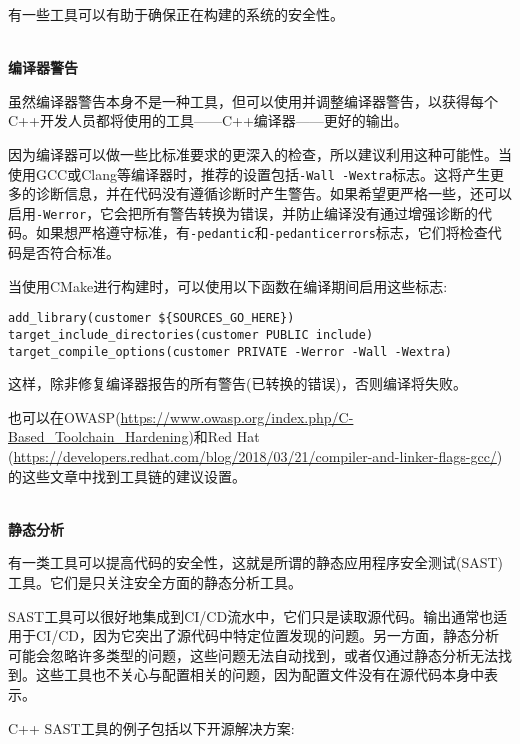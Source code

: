 有一些工具可以有助于确保正在构建的系统的安全性。

\hspace*{\fill} \\ %
\noindent
\textbf{编译器警告}

虽然编译器警告本身不是一种工具，但可以使用并调整编译器警告，以获得每个C++开发人员都将使用的工具——C++编译器——更好的输出。

因为编译器可以做一些比标准要求的更深入的检查，所以建议利用这种可能性。当使用GCC或Clang等编译器时，推荐的设置包括\texttt{-Wall -Wextra}标志。这将产生更多的诊断信息，并在代码没有遵循诊断时产生警告。如果希望更严格一些，还可以启用\texttt{-Werror}，它会把所有警告转换为错误，并防止编译没有通过增强诊断的代码。如果想严格遵守标准，有\texttt{-pedantic}和\texttt{-pedanticerrors}标志，它们将检查代码是否符合标准。

当使用CMake进行构建时，可以使用以下函数在编译期间启用这些标志:

\begin{lstlisting}[style=styleCMake]
add_library(customer ${SOURCES_GO_HERE})
target_include_directories(customer PUBLIC include)
target_compile_options(customer PRIVATE -Werror -Wall -Wextra)
\end{lstlisting}

这样，除非修复编译器报告的所有警告(已转换的错误)，否则编译将失败。

也可以在OWASP(\url{https://www.owasp.org/index.php/C-Based\_Toolchain\_Hardening})和Red Hat (\url{https://developers.redhat.com/blog/2018/03/21/compiler-and-linker-flags-gcc/})的这些文章中找到工具链的建议设置。

\hspace*{\fill} \\ %
\noindent
\textbf{静态分析}

有一类工具可以提高代码的安全性，这就是所谓的静态应用程序安全测试(SAST)工具。它们是只关注安全方面的静态分析工具。

SAST工具可以很好地集成到CI/CD流水中，它们只是读取源代码。输出通常也适用于CI/CD，因为它突出了源代码中特定位置发现的问题。另一方面，静态分析可能会忽略许多类型的问题，这些问题无法自动找到，或者仅通过静态分析无法找到。这些工具也不关心与配置相关的问题，因为配置文件没有在源代码本身中表示。

C++ SAST工具的例子包括以下开源解决方案:

